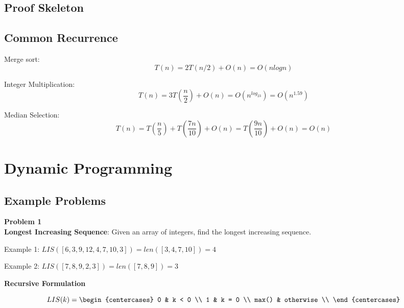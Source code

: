 \documentclass[12pt,article]{article}
\newenvironment{problem}[2][Problem]
    { \begin{mdframed}[backgroundcolor=gray!20] \textbf{#1 #2} \\}
    {  \end{mdframed}}
\begin{document}
\subsection{Proof Skeleton}



\subsection{Common Recurrence}

Merge sort: $$T(n) = 2T(n/2) + O(n) = O(nlogn)$$

Integer Multiplication: 
$$T(n) = 3T(\frac{n}{2}) + O(n) = O(n^{log_23}) = O(n^{1.59})$$

Median Selection: 
$$T(n) = T(\frac{n}{5}) + T(\frac{7n}{10}) + O(n) = T(\frac{9n}{10}) + O(n) = O(n)$$


\newpage
\section{Dynamic Programming}
\subsection{Example Problems}

\begin{problem}{1}
\textbf{Longest Increasing Sequence}: Given an array of integers, find the longest increasing sequence. 

Example 1: $LIS([6,3,9,12,4,7,10,3]) = len([3,4,7,10]) = 4$

Example 2: $LIS([7,8,9,2,3]) = len([7,8,9]) = 3$

\end{problem}

\textbf{Recursive Formulation}

\tiny{
    \[
        LIS(k)=
        \begin{centercases}
            0               & k < 0 \\
            1               & k = 0 \\
            max()                & otherwise \\
        \end{centercases}
        \]
}

\normalsize{}
\end{document}

